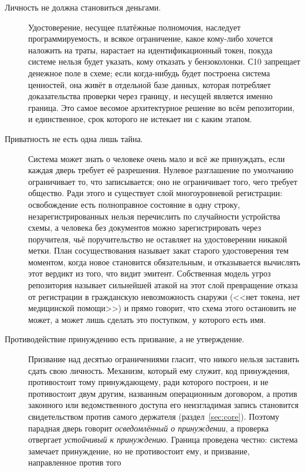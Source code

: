 \begin{description}
  \item[Личность не должна становиться деньгами.] Удостоверение, несущее платёжные полномочия,
    наследует программируемость, и всякое ограничение, какое кому-либо хочется наложить на траты,
    нарастает на идентификационный токен, покуда системе нельзя будет указать, кому отказать у
    бензоколонки. С10 запрещает денежное поле в схеме; если когда-нибудь будет построена система
    ценностей, она живёт в отдельной базе данных, которая потребляет доказательства проверки через
    границу, и несущей является именно граница. Это самое весомое архитектурное решение во всём
    репозитории, и единственное, срок которого не истекает ни с каким этапом.
  \item[Приватность не есть одна лишь тайна.] Система может знать о человеке очень мало и всё же
    принуждать, если каждая дверь требует её разрешения. Нулевое разглашение по умолчанию
    ограничивает то, что записывается; оно не ограничивает того, чего требует общество. Ради этого и
    существует слой многоуровневой регистрации: освобождение есть полноправное состояние в одну
    строку, незарегистрированных нельзя перечислить по случайности устройства схемы, а человека без
    документов можно зарегистрировать через поручителя, чьё поручительство не оставляет на
    удостоверении никакой метки. План сосуществования называет закат старого удостоверения тем
    моментом, когда новое становится обязательным, и отказывается вычислять этот вердикт из того,
    что видит эмитент. Собственная модель угроз репозитория называет сильнейшей атакой на этот слой
    превращение отказа от регистрации в гражданскую невозможность снаружи (<<нет токена, нет
    медицинской помощи>>) и прямо говорит, что схема этого остановить не может, а может лишь
    сделать это поступком, у которого есть имя.
  \item[Противодействие принуждению есть призвание, а не утверждение.] Призвание над десятью
    ограничениями гласит, что никого нельзя заставить сдать свою личность. Механизм, который ему
    служит, код принуждения, противостоит тому принуждающему, ради которого построен, и не
    противостоит двум другим, названным операционным договором, а против законного или
    ведомственного доступа его неизгладимая запись становится свидетельством против самого
    держателя (раздел~\ref{sec:core}). Поэтому парадная дверь говорит \emph{осведомлённый о
    принуждении}, а проверка отвергает \emph{устойчивый к принуждению}. Граница проведена честно:
    система замечает принуждение, но не противостоит ему, и призвание, направленное против того

\end{description}
